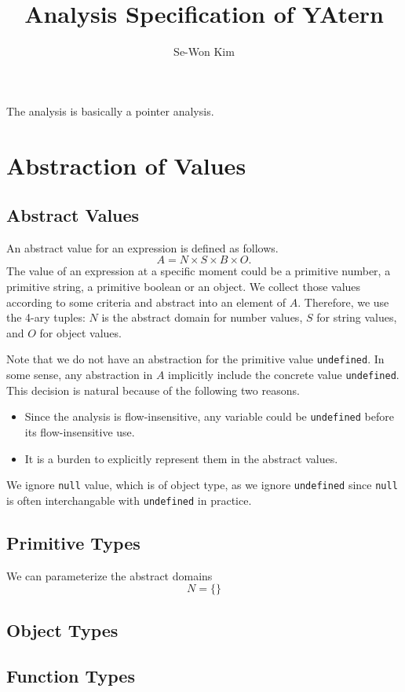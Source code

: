 \documentclass{report}
\begin{document}
\title{Analysis Specification of YAtern}
\author{Se-Won Kim}
\maketitle

The analysis is basically a pointer analysis.

\chapter{Abstraction of Values}
\section{Abstract Values}
An abstract value for an expression is defined as follows.
\[
A = N \times S \times B \times O.
\]
The value of an expression at a specific moment could be a primitive number, 
a primitive string, a primitive boolean or an object.
We collect those values according to some criteria 
and abstract into an element of $A$.
Therefore, we use the 4-ary tuples:
$N$ is the abstract domain for number values, 
$S$ for string values, and $O$ for object values. 

Note that we do not have an abstraction for the primitive 
value \texttt{undefined}. 
In some sense, any abstraction in $A$ implicitly include 
the concrete value \texttt{undefined}.
This decision is natural because of the following two reasons.
\begin{itemize}
\item Since the analysis is flow-insensitive,
  any variable could be \texttt{undefined} before its flow-insensitive use.
\item It is a burden to explicitly represent them in the abstract values.
\end{itemize}
We ignore \texttt{null} value, which is of object type,
as we ignore \texttt{undefined} 
since \texttt{null} is often interchangable 
with \texttt{undefined} in practice.

\section{Primitive Types}
We can parameterize the abstract domains 
\[
N = \{ \}
\]

\section{Object Types}

\section{Function Types}
\end{document}
